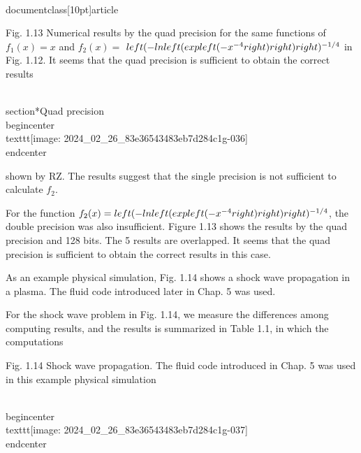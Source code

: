 \\documentclass[10pt]{article}
\begin{document}
Fig. 1.13 Numerical results by the quad precision for the same functions of $f_{1}(x)=x$ and $f_{2}(x)=$ $\\left(-\\ln \\left(\\exp \\left(-x^{-4}\\right)\\right)\\right)^{-1 / 4}$ in Fig. 1.12. It seems that the quad precision is sufficient to obtain the correct results

\\section*{Quad precision}
\\begin{center}
\\texttt{[image: 2024\_02\_26\_83e36543483eb7d284c1g-036]}
\\end{center}

shown by RZ. The results suggest that the single precision is not sufficient to calculate $f_{2}$.

For the function $f_{2}(x)=\\left(-\\ln \\left(\\exp \\left(-x^{-4}\\right)\\right)\\right)^{-1 / 4}$, the double precision was also insufficient. Figure 1.13 shows the results by the quad precision and 128 bits. The 5 results are overlapped. It seems that the quad precision is sufficient to obtain the correct results in this case.

As an example physical simulation, Fig. 1.14 shows a shock wave propagation in a plasma. The fluid code introduced later in Chap. 5 was used.

For the shock wave problem in Fig. 1.14, we measure the differences among computing results, and the results is summarized in Table 1.1, in which the computations

Fig. 1.14 Shock wave propagation. The fluid code introduced in Chap. 5 was used in this example physical simulation

\\begin{center}
\\texttt{[image: 2024\_02\_26\_83e36543483eb7d284c1g-037]}
\\end{center}
\end{document}
